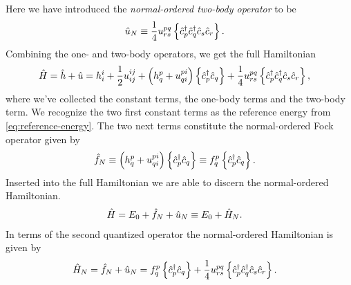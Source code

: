         Here we have introduced the \emph{normal-ordered two-body operator} to
        be
        \begin{align}
            \hat{u}_N
            &\equiv
            \frac{1}{4}u^{pq}_{rs}\left\{ 
                \hat{c}_{p}^{\dagger}
                \hat{c}_{q}^{\dagger}
                \hat{c}_{s}
                \hat{c}_{r}
             \right\}.
        \end{align}
        Combining the one- and two-body operators, we get the full Hamiltonian
        \begin{align}
            \hat{H}
            &=
            \hat{h} + \hat{u}
            =
            h^{i}_{i}
            + \frac{1}{2} u^{ij}_{ij}
            + \left( 
                h^{p}_{q}
                +
                u^{pi}_{qi}
             \right)
            \left\{ 
                \hat{c}_{p}^{\dagger}
                \hat{c}_{q}
             \right\}
            +
            \frac{1}{4}u^{pq}_{rs}
            \left\{ 
                \hat{c}_{p}^{\dagger}
                \hat{c}_{q}^{\dagger}
                \hat{c}_{s}
                \hat{c}_{r}
             \right\},
        \end{align}
        where we've collected the constant terms, the one-body terms and the
        two-body term.
        We recognize the two first constant terms as the reference energy from
        \autoref{eq:reference-energy}.
        The two next terms constitute the normal-ordered Fock operator given by
        \begin{align}
            \hat{f}_N
            &\equiv
            \left( 
                h^{p}_{q}
                +
                u^{pi}_{qi}
             \right)
            \left\{ 
                \hat{c}_{p}^{\dagger}
                \hat{c}_{q}
             \right\}
            \equiv
            f^{p}_{q}
            \left\{ 
                \hat{c}_{p}^{\dagger}
                \hat{c}_{q}
             \right\}.
        \end{align}
        Inserted into the full Hamiltonian we are able to discern the
        normal-ordered Hamiltonian.
        \begin{align}
            \hat{H}
            &=
            E_{0}
            +
            \hat{f}_N
            +
            \hat{u}_N
            \equiv
            E_{0}
            +
            \hat{H}_N.
        \end{align}
        In terms of the second quantized operator the normal-ordered Hamiltonian
        is given by
        \begin{align}
            \hat{H}_N
            &=
            \hat{f}_N + \hat{u}_N
            =
            f^{p}_{q}\left\{ 
                \hat{c}_{p}^{\dagger}
                \hat{c}_{q}
             \right\}
            +
            \frac{1}{4}
            u^{pq}_{rs}\left\{ 
                \hat{c}_{p}^{\dagger}
                \hat{c}_{q}^{\dagger}
                \hat{c}_{s}
                \hat{c}_{r}
             \right\}.
        \end{align}
